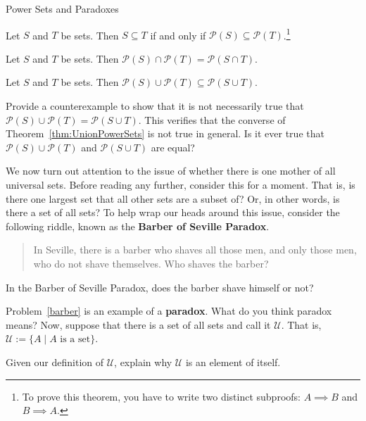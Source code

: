 \begin{section}{Power Sets and Paradoxes}
\begin{theorem}
Let $S$ and $T$ be sets.  Then $S\subseteq T$ if and only if $\mathcal{P}(S)\subseteq \mathcal{P}(T)$.\footnote{To prove this theorem, you have to write two distinct subproofs: $A\implies B$ and $B\implies A$.}
\end{theorem}

\begin{theorem}
Let $S$ and $T$ be sets.  Then $\mathcal{P}(S)\cap\mathcal{P}(T)=\mathcal{P}(S\cap T)$.
\end{theorem}

\begin{theorem}\label{thm:UnionPowerSets}
Let $S$ and $T$ be sets.  Then $\mathcal{P}(S)\cup\mathcal{P}(T)\subseteq \mathcal{P}(S\cup T)$.
\end{theorem}

\begin{problem}
Provide a counterexample to show that it is not necessarily true that $\mathcal{P}(S)\cup\mathcal{P}(T)= \mathcal{P}(S\cup T)$. This verifies that the converse of Theorem~\ref{thm:UnionPowerSets} is not true in general. Is it ever true that $\mathcal{P}(S)\cup\mathcal{P}(T)$ and  $\mathcal{P}(S\cup T)$ are equal?
\end{problem}

We now turn out attention to the issue of whether there is one mother of all universal sets.  Before reading any further, consider this for a moment.  That is, is there one largest set that all other sets are a subset of?  Or, in other words, is there a set of all sets?  To help wrap our heads around this issue, consider the following riddle, known as the \textbf{Barber of Seville Paradox}.

\begin{quote}
In Seville, there is a barber who shaves all those men, and only those men, who do not shave themselves.  Who shaves the barber?
\end{quote}

\begin{problem}\label{barber}
In the Barber of Seville Paradox, does the barber shave himself or not?
\end{problem}

Problem~\ref{barber} is an example of a \textbf{paradox}.  What do you think paradox means?  Now, suppose that there is a set of all sets and call it $\mathcal{U}$.  That is, $\mathcal{U}:=\{A\mid A\mbox{ is a set}\}$.

\begin{problem}
Given our definition of $\mathcal{U}$, explain why $\mathcal{U}$ is an element of itself.
\end{problem}


\end{section}
